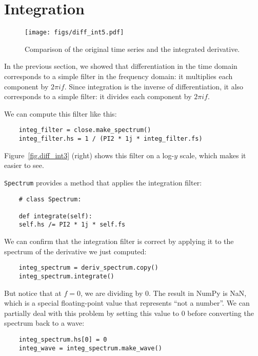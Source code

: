 \section{Integration}

\begin{figure}
	\centerline{\texttt{[image: figs/diff\_int5.pdf]}}
	\caption{Comparison of the original time series and the integrated
		derivative.}
	\label{fig.diff_int5}
\end{figure}

In the previous section, we showed that differentiation in the time
domain corresponds to a simple filter in the frequency domain: it
multiplies each component by $2 \pi i f$.  Since integration is
the inverse of differentiation, it also corresponds to a simple
filter: it divides each component by $2 \pi i f$.

We can compute this filter like this:

\begin{verbatim}
	integ_filter = close.make_spectrum()
	integ_filter.hs = 1 / (PI2 * 1j * integ_filter.fs)
\end{verbatim}

Figure~\ref{fig.diff_int3} (right) shows this filter on a log-$y$ scale,
which makes it easier to see.

{\tt Spectrum} provides a method that applies the integration filter:

\begin{verbatim}
	# class Spectrum:
	
	def integrate(self):
	self.hs /= PI2 * 1j * self.fs
\end{verbatim}

We can confirm that the integration filter is correct by applying it
to the spectrum of the derivative we just computed:

\begin{verbatim}
	integ_spectrum = deriv_spectrum.copy()
	integ_spectrum.integrate()
\end{verbatim}

But notice that at $f=0$, we are dividing by 0.  The result in
NumPy is NaN, which is a special floating-point value that
represents ``not a number''.  We can partially deal with this
problem by setting this value to 0 before converting the
spectrum back to a wave:

\begin{verbatim}
	integ_spectrum.hs[0] = 0
	integ_wave = integ_spectrum.make_wave()
\end{verbatim}

